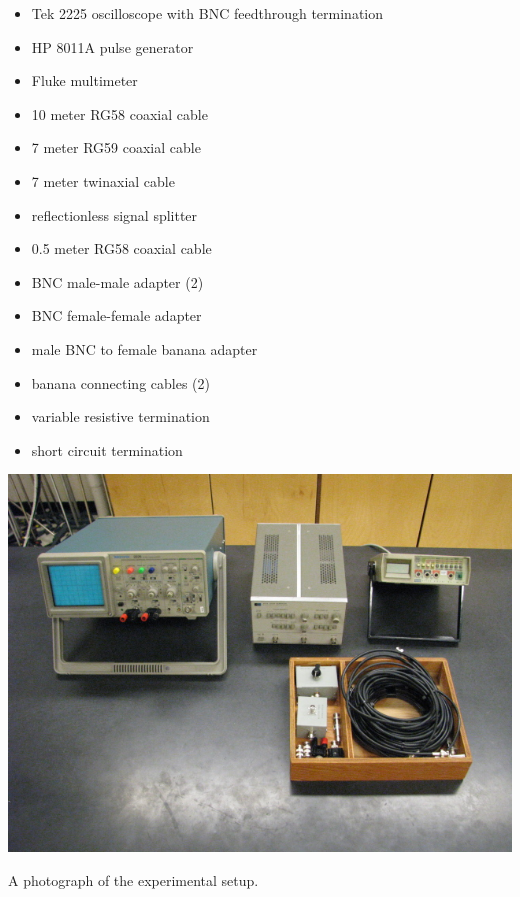 \begin{minipage}[t]{0.5\textwidth}
\begin{itemize}[noitemsep]
\item Tek 2225 oscilloscope with BNC feedthrough termination
\item HP 8011A pulse generator
\item Fluke multimeter
\item 10 meter RG58 coaxial cable
\item 7 meter RG59 coaxial cable
\item 7 meter twinaxial cable
\item reflectionless signal splitter
\end{itemize}
\end{minipage}
\begin{minipage}[t]{0.5\textwidth}
\begin{itemize}[noitemsep]
\item 0.5 meter RG58 coaxial cable
\item BNC male-male adapter (2)
\item BNC female-female adapter
\item male BNC to female banana adapter
\item banana connecting cables (2)
\item variable resistive termination
\item short circuit termination
\end{itemize}
\end{minipage}

\begin{marginfigure}[+2in]
\includegraphics{Travelling-Waves-Setup.jpg}
\caption{A photograph of the experimental setup.}
\label{fig:TWsetup}
\end{marginfigure}

